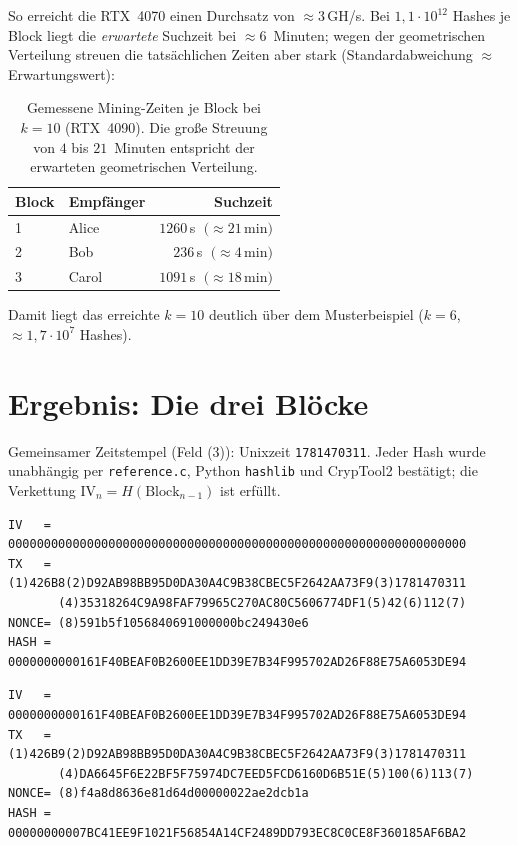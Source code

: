 \documentclass[
    fontsize=12pt,          %
    paper=a4,               %
    numbers=noenddot,       %
    listof=totoc,           %
    listof=entryprefix,     %
    listof=nochaptergap,    %
    bibliography=totoc,     %
    parskip=half,           %
    openany                 %
]{scrbook}
\begin{document}
\noindent So erreicht die RTX~4070 einen Durchsatz von $\approx 3$\,GH/s. Bei $1{,}1\cdot10^{12}$
Hashes je Block liegt die \emph{erwartete} Suchzeit bei $\approx 6$~Minuten; wegen der geometrischen
Verteilung streuen die tatsächlichen Zeiten aber stark (Standardabweichung $\approx$ Erwartungswert):

\begin{table}[H]
    \centering
    \begin{tabular}{l l r}
        \toprule
        \textbf{Block} & \textbf{Empfänger} & \textbf{Suchzeit} \\
        \midrule
        1 & Alice & $1260$\,s $\;(\approx 21$\,min$)$ \\
        2 & Bob   & $\phantom{0}236$\,s $\;(\approx 4$\,min$)$ \\
        3 & Carol & $1091$\,s $\;(\approx 18$\,min$)$ \\
        \bottomrule
    \end{tabular}
    \caption{Gemessene Mining-Zeiten je Block bei $k=10$ (RTX~4090). Die große Streuung von
             $4$ bis $21$~Minuten entspricht der erwarteten geometrischen Verteilung.}
\end{table}

\noindent Damit liegt das erreichte $k=10$ deutlich über dem Musterbeispiel ($k=6$, $\approx 1{,}7\cdot10^7$
Hashes).


\section*{Ergebnis: Die drei Blöcke}

Gemeinsamer Zeitstempel (Feld (3)): Unixzeit \texttt{1781470311}.
Jeder Hash wurde unabhängig per \texttt{reference.c}, Python \texttt{hashlib} und CrypTool2
bestätigt; die Verkettung $\text{IV}_n = H(\text{Block}_{n-1})$ ist erfüllt.

\begin{lstlisting}[caption={Block 1 -- an Alice ($H$ mit 10 führenden Nullen)}]
IV   = 0000000000000000000000000000000000000000000000000000000000000000
TX   = (1)426B8(2)D92AB98BB95D0DA30A4C9B38CBEC5F2642AA73F9(3)1781470311
       (4)35318264C9A98FAF79965C270AC80C5606774DF1(5)42(6)112(7)
NONCE= (8)591b5f1056840691000000bc249430e6
HASH = 0000000000161F40BEAF0B2600EE1DD39E7B34F995702AD26F88E75A6053DE94
\end{lstlisting}

\begin{lstlisting}[caption={Block 2 -- an Bob}]
IV   = 0000000000161F40BEAF0B2600EE1DD39E7B34F995702AD26F88E75A6053DE94
TX   = (1)426B9(2)D92AB98BB95D0DA30A4C9B38CBEC5F2642AA73F9(3)1781470311
       (4)DA6645F6E22BF5F75974DC7EED5FCD6160D6B51E(5)100(6)113(7)
NONCE= (8)f4a8d8636e81d64d00000022ae2dcb1a
HASH = 00000000007BC41EE9F1021F56854A14CF2489DD793EC8C0CE8F360185AF6BA2
\end{lstlisting}
\end{document}
